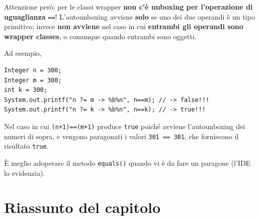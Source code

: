 \documentclass[\fontsizeclass,twocolumn]{\classname}
\let\oldtextsc\textsc
\renewcommand{\textsc}[1]{\oldtextsc{\scfontfs #1}}
\theoremstyle{definition}
\theoremstyle{definition}
\begin{document}
Attenzione però: per le classi wrapper \textbf{non c'è unboxing per
l'operazione di uguaglianza} \texttt{==}! L'autounboxing avviene \textbf{solo}
se uno dei due operandi è un tipo primitivo; invece \textbf{non avviene} nel
caso in cui \textbf{entrambi gli operandi sono wrapper classes}, o comunque
quando entrambi sono oggetti.

Ad esempio,

\begin{lstlisting}
Integer n = 300;
Integer m = 300;
int k = 300;
System.out.printf("n ?= m -> %b%n", n==m); // -> false!!!
System.out.printf("n ?= k -> %b%n", n==k); // -> true!!!
\end{lstlisting}

Nel caso in cui \texttt{(n+1)==(m+1)} produce \texttt{true} poiché avviene
l'autounboxing dei numeri di sopra, e vengono paragonati i valori \texttt{301
== 301}, che forniscono il risultato \texttt{true}.

È meglio adoperare il metodo \texttt{equals()} quando vi è da fare un paragone
(l'\textsc{IDE} lo evidenzia).

\section{Riassunto del capitolo}
\end{document}
